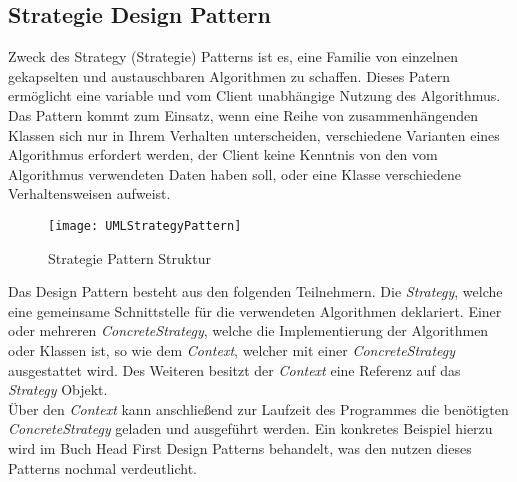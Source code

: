 \subsection{Strategie Design Pattern}
Zweck des Strategy (Strategie) Patterns ist es, eine Familie von einzelnen gekapselten und austauschbaren Algorithmen zu schaffen. Dieses Patern ermöglicht eine variable und vom Client unabhängige Nutzung des Algorithmus.\\
Das Pattern kommt zum Einsatz, wenn eine Reihe von zusammenhängenden Klassen sich nur in Ihrem Verhalten unterscheiden, verschiedene Varianten eines Algorithmus erfordert werden, der Client keine Kenntnis von den vom Algorithmus verwendeten Daten haben soll, oder eine Klasse verschiedene Verhaltensweisen aufweist.\\
\begin{center}
    \begin{figure}[h]
     \centering
     \texttt{[image: UMLStrategyPattern]}
     \caption{Strategie Pattern Struktur \cite{DesignPatterns}}
    \label{fig:StrategyPattern}
    \end{figure}
\end{center}
\vspace{-2cm}
Das Design Pattern besteht aus den folgenden Teilnehmern. Die \textit{Strategy}, welche eine gemeinsame Schnittstelle für die verwendeten Algorithmen deklariert. Einer oder mehreren \textit{ConcreteStrategy}, welche die Implementierung der Algorithmen oder Klassen ist, so wie dem \textit{Context}, welcher mit einer \textit{ConcreteStrategy} ausgestattet wird. Des Weiteren besitzt der \textit{Context} eine Referenz auf das \textit{Strategy} Objekt.\cite[S.383 ff]{DesignPatterns}\\
Über den \textit{Context} kann anschließend zur Laufzeit des Programmes die benötigten \textit{ConcreteStrategy} geladen und ausgeführt werden. 
Ein konkretes Beispiel hierzu wird im Buch Head First Design Patterns \cite{HeadfirstDesignPatterns} behandelt, was den nutzen dieses Patterns nochmal verdeutlicht.